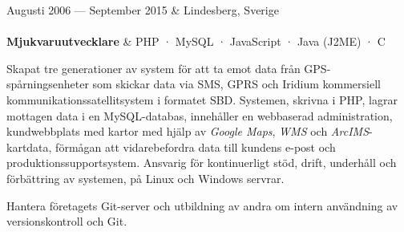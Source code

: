 \documentclass{cv-stylish}
\begin{document}
\begin{center}
\vspace{1em}
\pagebreak
\begin{JobTable}
  Augusti 2006 --- September 2015 & \hfill Lindesberg, Sverige \\[3pt]
   \\[3pt]
  \hspace{5mm} \textbf{Mjukvaruutvecklare}
  & \hfill PHP · MySQL · JavaScript · Java (J2ME) · C \\
\end{JobTable}
\begin{adjustwidth}{0.015\linewidth}{0.015\linewidth}
\begin{compactitem}
  \item Skapat tre generationer av system för att ta emot data från
    GPS-spårningsenheter som skickar data via SMS, GPRS och Iridium
    kommersiell kommunikationssatellitsystem i formatet SBD.
    Systemen, skrivna i PHP, lagrar mottagen data i en MySQL-databas, innehåller en webbaserad administration, kundwebbplats
    med kartor med hjälp av \emph{Google Maps}, \emph{WMS} och \emph{ArcIMS}-kartdata, förmågan att vidarebefordra
    data till kundens e-post och produktionssupportsystem. Ansvarig för kontinuerligt stöd,
    drift, underhåll och förbättring av systemen, på Linux och Windows
    servrar.
  \item Hantera företagets Git-server och utbildning av andra om
    intern användning av versionskontroll och Git.
\end{compactitem}
\end{adjustwidth}



\end{center}
\end{document}
